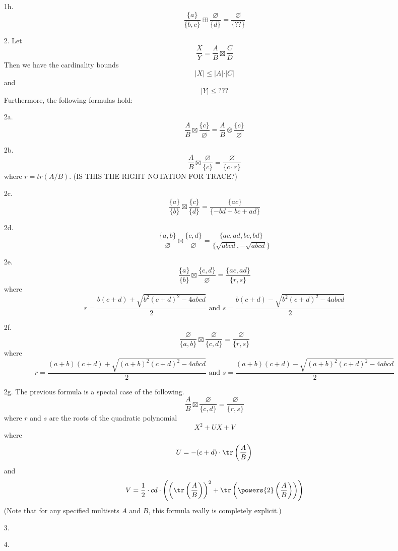 \documentclass[a4paper]{article}
\begin{document}
\begin{theorem}
\begin{itemize}
\item[1h.] $$\frac{ \{a \}  }{\{ b,c \} } \boxplus \frac{\varnothing}{ \{  d \} } = \frac{ \varnothing  }{ \{ ?? \} }$$


\item[2.] Let $$\frac{X}{Y} = \frac{A}{B} \boxtimes \frac{C}{D}$$
Then we have the cardinality bounds
$$ \vert X \vert \leq \vert A \vert \cdot \vert C \vert   $$ 
and 
$$  \vert Y \vert \leq ???  $$
Furthermore, the following formulas hold:

\item[2a.] $$\frac{ A }{ B } \boxtimes \frac{\{ c \}}{ \varnothing }=\frac{A }{ B } \otimes \frac{\{ c \}}{ \varnothing }$$

\item[2b.] $$\frac{A }{ B } \boxtimes \frac{ \varnothing }{\{ c \}} = \frac{\varnothing}{\{c \cdot r\}}$$
where $r = tr(A/B)$. (IS THIS THE RIGHT NOTATION FOR TRACE?)

\item[2c.] $$\frac{\{a\}}{\{b\}} \boxtimes \frac{\{c\}}{\{d\}} = \frac{\{ac\}}{\{-bd+bc+ad\}}$$

\item[2d.] $$\frac{\{a,b\}}{\varnothing} \boxtimes \frac{\{c,d\}}{\varnothing} = \frac{\{ac,ad,bc,bd\}}{\{\sqrt{abcd}, -\sqrt{abcd}\}}$$


\item[2e.] $$\frac{\{a\}}{\{b\}} \boxtimes \frac{\{c,d\}}{\varnothing} = \frac{\{ac,ad\}}{\{r, s\}}$$
where 
$$r = \frac{b(c+d) + \sqrt{b^2 (c+d)^2 - 4abcd}}{2} \text{\ and\ } s = \frac{b(c+d) - \sqrt{b^2 (c+d)^2 - 4abcd}}{2}$$


\item[2f.] $$\frac{\varnothing}{\{a, b\}} \boxtimes \frac{\varnothing}{\{c,d\}} = \frac{\varnothing}{\{r, s\}}$$
where 
$$r = \frac{(a+b)(c+d) + \sqrt{(a+b)^2 (c+d)^2 - 4abcd}}{2} \text{\ and\ } s = \frac{(a+b)(c+d) - \sqrt{(a+b)^2 (c+d)^2 - 4abcd}}{2}$$

\item[2g.] The previous formula is a special case of the following.
$$\frac{A}{B} \boxtimes \frac{\varnothing}{\{c,d\}} = \frac{\varnothing}{\{r, s\}}$$
where $r$ and $s$ are the roots of the quadratic polynomial
$$ X^2 + UX + V   $$   
where
$$ U = -(c+d) \cdot \tr \left( \frac{A}{B}  \right)   $$
and
$$ V = \frac{1}{2}\cdot cd \cdot \left (  \left( \tr \left( \frac{A}{B}  \right) \right)^2    + \tr \left(   \powers{2} \left(  \frac{A}{B}  \right)   \right)   \right) $$
(Note that for any specified multisets $A$ and $B$, this formula really is completely explicit.)

\item[3.] 



\item[4.] 

\end{itemize}



\end{theorem}
\end{document}
